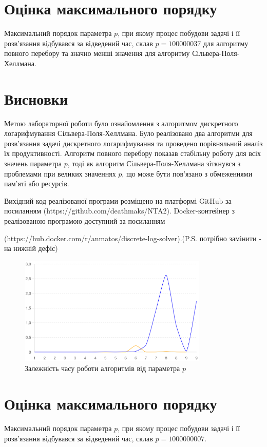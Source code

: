 \documentclass[12pt]{article}
\begin{document}
\section{Оцінка максимального порядку}
Максимальний порядок параметра \( p \), при якому процес побудови задачі і її розв'язання відбувався за відведений час, склав \( p = 100000037 \) для алгоритму повного перебору та значно менші значення для алгоритму Сільвера-Поля-Хеллмана.

\section{Висновки}
Метою лабораторної роботи було ознайомлення з алгоритмом дискретного логарифмування Сільвера-Поля-Хеллмана. Було реалізовано два алгоритми для розв'язання задачі дискретного логарифмування та проведено порівняльний аналіз їх продуктивності. Алгоритм повного перебору показав стабільну роботу для всіх значень параметра \( p \), тоді як алгоритм Сільвера-Поля-Хеллмана зіткнувся з проблемами при великих значеннях \( p \), що може бути пов'язано з обмеженнями пам'яті або ресурсів.

Вихідний код реалізованої програми розміщено на платформі GitHub за посиланням (https://github.com/deathmaks/NTA2).
Docker-контейнер з реалізованою програмою доступний за посиланням

(https://hub.docker.com/r/anmatos/discrete-log-solver).(P.S. потрібно замінити - на нижній дефіс)

\begin{figure}[h]
\centering
\includegraphics[width=0.8\textwidth]{time.png}
\caption{Залежність часу роботи алгоритмів від параметра \( p \)}
\end{figure}

\section{Оцінка максимального порядку}
Максимальний порядок параметра \( p \), при якому процес побудови задачі і її розв'язання відбувався за відведений час, склав \( p = 1000000007 \).
\end{document}
